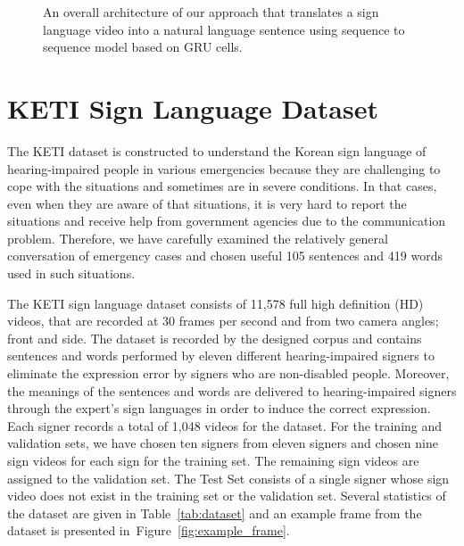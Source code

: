 \documentclass[10pt,twocolumn,letterpaper]{article}
\begin{document}
\begin{figure*}
\caption{An overall architecture of our approach that translates a sign language video into a natural language sentence using sequence to sequence model based on GRU cells.}
\end{figure*}


\section{KETI Sign Language Dataset}

The KETI dataset is constructed to understand the Korean sign language of hearing-impaired people in various emergencies because they are challenging to cope with the situations and sometimes are in severe conditions.
In that cases, even when they are aware of that situations, it is very hard to report the situations and receive help from government agencies due to the communication problem.
Therefore, we have carefully examined the relatively general conversation of emergency cases and chosen useful 105 sentences and 419 words used in such situations.

The KETI sign language dataset consists of 11,578 full high definition (HD) videos, that are recorded at 30 frames per second and from two camera angles; front and side. The dataset is recorded by the designed corpus and contains sentences and words performed by eleven different hearing-impaired signers to eliminate the expression error by signers who are non-disabled people. Moreover, the meanings of the sentences and words are delivered to hearing-impaired signers through the expert's sign languages in order to induce the correct expression.
Each signer records a total of 1,048 videos for the dataset. For the training and validation sets, we have chosen ten signers from eleven signers and chosen nine sign videos for each sign for the training set. The remaining sign videos are assigned to the validation set. The Test Set consists of a single signer whose sign video does not exist in the training set or the validation set. Several statistics of the dataset are given in Table~\ref{tab:dataset} and an example frame from the dataset is presented in~Figure~\ref{fig:example_frame}.
\end{document}
